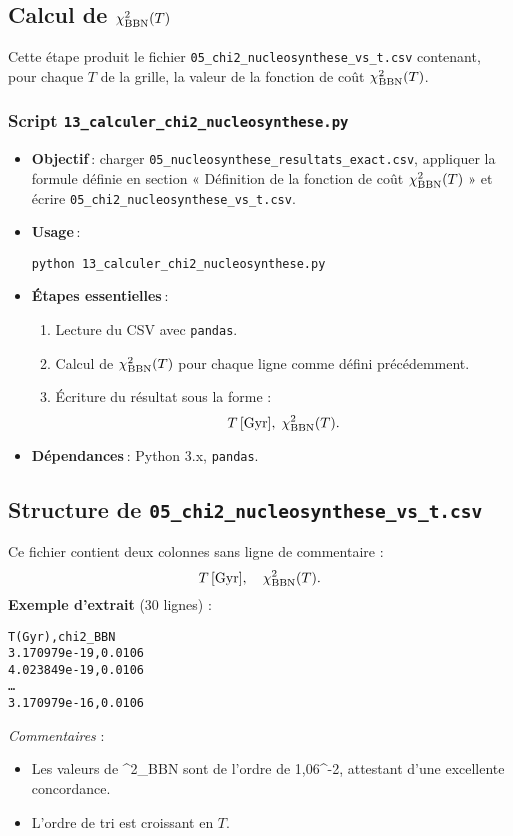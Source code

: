 \subsection{Calcul de \(\chi^{2}_{\rm BBN}(T)\)}

Cette étape produit le fichier \texttt{05\_chi2\_nucleosynthese\_vs\_t.csv} contenant, pour chaque \(T\) de la grille, la valeur de la fonction de coût \(\chi^{2}_{\rm BBN}(T)\).

\subsubsection*{Script \texttt{13\_calculer\_chi2\_nucleosynthese.py}}

\begin{itemize}
  \item \textbf{Objectif} : charger \texttt{05\_nucleosynthese\_resultats\_exact.csv}, appliquer la formule définie en section « Définition de la fonction de coût \(\chi^{2}_{\rm BBN}(T)\) » et écrire \texttt{05\_chi2\_nucleosynthese\_vs\_t.csv}.
  \item \textbf{Usage} :
    \begin{verbatim}
python 13_calculer_chi2_nucleosynthese.py
    \end{verbatim}
  \item \textbf{Étapes essentielles} :
    \begin{enumerate}
      \item Lecture du CSV avec \texttt{pandas}.
      \item Calcul de \(\chi^{2}_{\rm BBN}(T)\) pour chaque ligne comme défini précédemment.
      \item Écriture du résultat sous la forme :
        \[
          T\,[\mathrm{Gyr}],\;\chi^{2}_{\rm BBN}(T).
        \]
    \end{enumerate}

  \item \textbf{Dépendances} : Python 3.x, \texttt{pandas}.
\end{itemize}

\subsection{Structure de \texttt{05\_chi2\_nucleosynthese\_vs\_t.csv}}
Ce fichier contient deux colonnes sans ligne de commentaire :
\[
  T\,[\mathrm{Gyr}],\quad \chi^{2}_{\rm BBN}(T).
\]
\noindent\textbf{Exemple d’extrait} (30 lignes) :
\begin{verbatim}
T(Gyr),chi2_BBN
3.170979e-19,0.0106
4.023849e-19,0.0106
…
3.170979e-16,0.0106
\end{verbatim}
\noindent\emph{Commentaires} :
\begin{itemize}
  \item Les valeurs de \chi^{2}_{\rm BBN} sont de l’ordre de 1,06^{-2}, attestant d’une excellente concordance.
  \item L’ordre de tri est croissant en \(T\).
\end{itemize}

